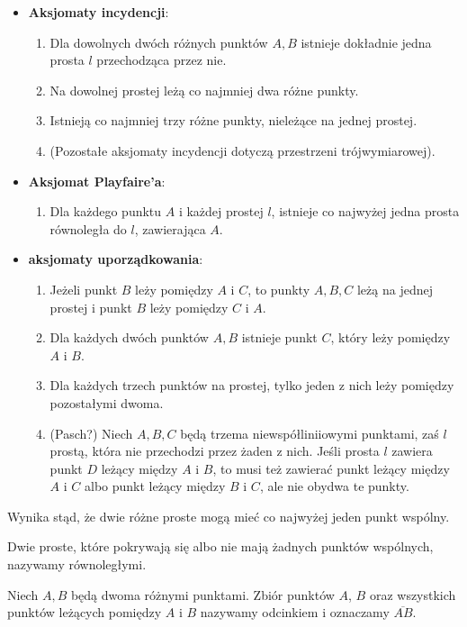 \documentclass{parchment}
\begin{document}
\begin{itemize}
	\item \textbf{Aksjomaty incydencji}:
\begin{enumerate}
	\item Dla dowolnych dwóch różnych punktów $A, B$ istnieje dokładnie jedna prosta $l$ przechodząca przez nie.
	\item Na dowolnej prostej leżą co najmniej dwa różne punkty.
	\item Istnieją co najmniej trzy różne punkty, nieleżące na jednej prostej.
	\item (Pozostałe aksjomaty incydencji dotyczą przestrzeni trójwymiarowej).
\end{enumerate}
\item \textbf{Aksjomat Playfaire'a}:
\begin{enumerate}
	\item Dla każdego punktu $A$ i każdej prostej $l$, istnieje co najwyżej jedna prosta równoległa do $l$, zawierająca $A$.
\end{enumerate}
\item \textbf{aksjomaty uporządkowania}: \begin{enumerate}
	\item Jeżeli punkt $B$ leży pomiędzy $A$ i $C$, to punkty $A, B, C$ leżą na jednej prostej i punkt $B$ leży pomiędzy $C$ i $A$.
	\item Dla każdych dwóch punktów $A, B$ istnieje punkt $C$, który leży pomiędzy $A$ i $B$.
	\item Dla każdych trzech punktów na prostej, tylko jeden z nich leży pomiędzy pozostałymi dwoma.
	\item (Pasch?) Niech $A, B, C$ będą trzema niewspółliniiowymi punktami, zaś $l$ prostą, która nie przechodzi przez żaden z nich. Jeśli prosta $l$ zawiera punkt $D$ leżący między $A$ i $B$, to musi też zawierać punkt leżący między $A$ i $C$ albo punkt leżący między $B$ i $C$, ale nie obydwa te punkty.
\end{enumerate}
\end{itemize}

Wynika stąd, że dwie różne proste mogą mieć co najwyżej jeden punkt wspólny.

\begin{definition}[równoległość]
	Dwie proste, które pokrywają się albo nie mają żadnych punktów wspólnych, nazywamy równoległymi.
\end{definition}

\begin{definition}[odcinek]
	Niech $A, B$ będą dwoma różnymi punktami.
	Zbiór punktów $A$, $B$ oraz wszystkich punktów leżących pomiędzy $A$ i $B$ nazywamy odcinkiem i oznaczamy $\overline{AB}$.
\end{definition}
\end{document}

